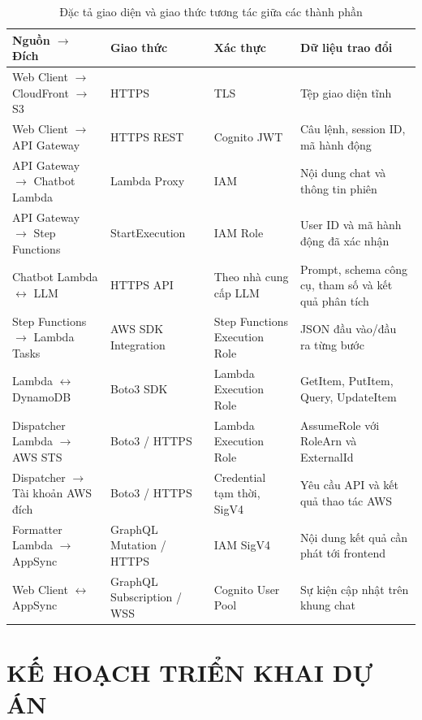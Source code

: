 \documentclass[a4paper,12pt]{article}
\begin{document}
\begin{table}[H]
\centering
\caption{Đặc tả giao diện và giao thức tương tác giữa các thành phần}
\label{tab:inter_service_interfaces}
\begingroup
\renewcommand{\arraystretch}{1.12}
\fontsize{8.5}{11.2}\selectfont
\begin{tabularx}{\linewidth}{@{}>{\raggedright\arraybackslash}p{4.1cm}>{\raggedright\arraybackslash}p{2.35cm}>{\raggedright\arraybackslash}p{3.05cm}Y@{}}
\toprule
\textbf{Nguồn $\rightarrow$ Đích} & \textbf{Giao thức} & \textbf{Xác thực} & \textbf{Dữ liệu trao đổi}\\
\midrule
Web Client $\rightarrow$ CloudFront $\rightarrow$ S3 & HTTPS & TLS & Tệp giao diện tĩnh\\
Web Client $\rightarrow$ API Gateway & HTTPS REST & Cognito JWT & Câu lệnh, session ID, mã hành động\\
API Gateway $\rightarrow$ Chatbot Lambda & Lambda Proxy & IAM & Nội dung chat và thông tin phiên\\
API Gateway $\rightarrow$ Step Functions & StartExecution & IAM Role & User ID và mã hành động đã xác nhận\\
Chatbot Lambda $\leftrightarrow$ LLM & HTTPS API & Theo nhà cung cấp LLM & Prompt, schema công cụ, tham số và kết quả phân tích\\
Step Functions $\rightarrow$ Lambda Tasks & AWS SDK Integration & Step Functions Execution Role & JSON đầu vào/đầu ra từng bước\\
Lambda $\leftrightarrow$ DynamoDB & Boto3 SDK & Lambda Execution Role & GetItem, PutItem, Query, UpdateItem\\
Dispatcher Lambda $\rightarrow$ AWS STS & Boto3 / HTTPS & Lambda Execution Role & AssumeRole với RoleArn và ExternalId\\
Dispatcher $\rightarrow$ Tài khoản AWS đích & Boto3 / HTTPS & Credential tạm thời, SigV4 & Yêu cầu API và kết quả thao tác AWS\\
Formatter Lambda $\rightarrow$ AppSync & GraphQL Mutation / HTTPS & IAM SigV4 & Nội dung kết quả cần phát tới frontend\\
Web Client $\leftrightarrow$ AppSync & GraphQL Subscription / WSS & Cognito User Pool & Sự kiện cập nhật trên khung chat\\
\bottomrule
\end{tabularx}
\endgroup
\end{table}

\clearpage

\section{KẾ HOẠCH TRIỂN KHAI DỰ ÁN}
\end{document}
